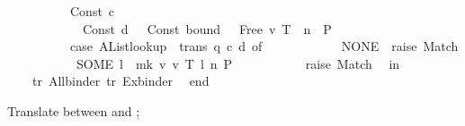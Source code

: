 \begin{isabellebody}
\ \ \ \ \ \ \ \ \ \ Const\ {\isacharparenleft}{\kern0pt}c{\isacharcomma}{\kern0pt}\ {\isacharunderscore}{\kern0pt}{\isacharparenright}{\kern0pt}\ {\isachardollar}{\kern0pt}\isanewline
\ \ \ \ \ \ \ \ \ \ \ \ {\isacharparenleft}{\kern0pt}Const\ {\isacharparenleft}{\kern0pt}d{\isacharcomma}{\kern0pt}\ {\isacharunderscore}{\kern0pt}{\isacharparenright}{\kern0pt}\ {\isachardollar}{\kern0pt}\ {\isacharparenleft}{\kern0pt}Const\ {\isacharparenleft}{\kern0pt}\isactrlsyntaxUNDERSCOREconst {\isasymopen}{\isacharunderscore}{\kern0pt}bound{\isasymclose}{\isacharcomma}{\kern0pt}\ {\isacharunderscore}{\kern0pt}{\isacharparenright}{\kern0pt}\ {\isachardollar}{\kern0pt}\ Free\ {\isacharparenleft}{\kern0pt}v{\isacharprime}{\kern0pt}{\isacharcomma}{\kern0pt}\ T{\isacharparenright}{\kern0pt}{\isacharparenright}{\kern0pt}\ {\isachardollar}{\kern0pt}\ n{\isacharparenright}{\kern0pt}\ {\isachardollar}{\kern0pt}\ P{\isacharbrackright}{\kern0pt}\ {\isacharequal}{\kern0pt}{\isachargreater}{\kern0pt}\isanewline
\ \ \ \ \ \ \ \ \ \ {\isacharparenleft}{\kern0pt}case\ AList{\isachardot}{\kern0pt}lookup\ {\isacharparenleft}{\kern0pt}{\isacharequal}{\kern0pt}{\isacharparenright}{\kern0pt}\ trans\ {\isacharparenleft}{\kern0pt}q{\isacharcomma}{\kern0pt}\ c{\isacharcomma}{\kern0pt}\ d{\isacharparenright}{\kern0pt}\ of\isanewline
\ \ \ \ \ \ \ \ \ \ \ \ NONE\ {\isacharequal}{\kern0pt}{\isachargreater}{\kern0pt}\ raise\ Match\isanewline
\ \ \ \ \ \ \ \ \ \ {\isacharbar}{\kern0pt}\ SOME\ l\ {\isacharequal}{\kern0pt}{\isachargreater}{\kern0pt}\ mk\ v\ {\isacharparenleft}{\kern0pt}v{\isacharprime}{\kern0pt}{\isacharcomma}{\kern0pt}\ T{\isacharparenright}{\kern0pt}\ l\ n\ P{\isacharparenright}{\kern0pt}\isanewline
\ \ \ \ \ \ \ \ {\isacharbar}{\kern0pt}\ {\isacharunderscore}{\kern0pt}\ {\isacharequal}{\kern0pt}{\isachargreater}{\kern0pt}\ raise\ Match{\isacharparenright}{\kern0pt}{\isacharparenright}{\kern0pt}{\isacharsemicolon}{\kern0pt}\isanewline
\ \ in\isanewline
\ \ \ \ {\isacharbrackleft}{\kern0pt}tr{\isacharprime}{\kern0pt}\ All{\isacharunderscore}{\kern0pt}binder{\isacharcomma}{\kern0pt}\ tr{\isacharprime}{\kern0pt}\ Ex{\isacharunderscore}{\kern0pt}binder{\isacharbrackright}{\kern0pt}\isanewline
\ \ end\isanewline
{\isacartoucheclose}%
\endisatagML
{\isafoldML}%
%
\isadelimML
%
\endisadelimML
%
\begin{isamarkuptext}%
\medskip
  Translate between  and ;

\end{isamarkuptext}
\end{isabellebody}
